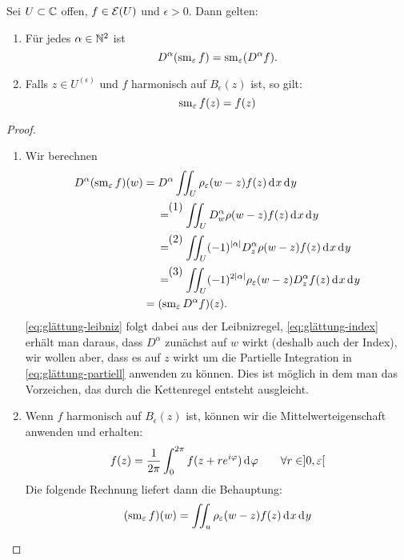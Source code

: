 \begin{lemma}
  \label{lemma:glättung-eigenschaften}
  Sei $U \subset \mathbb{C}$ offen, $f \in \mathcal{E}(U)$ und $\epsilon > 0 $. Dann
  gelten:
  \begin{enumerate}
  \item Für jedes $\alpha \in \mathbb{N}^2$ ist
    \[
    D^\alpha( \operatorname{sm}_\varepsilon f) =
    \operatorname{sm}_\varepsilon (D^\alpha f).
    \]
  \item Falls $z \in U^{(\epsilon)}$ und $f$ harmonisch auf
    $B_\epsilon(z)$ ist, so gilt:
    \[
    \operatorname{sm}_\varepsilon f(z) = f(z)
    \]
  \end{enumerate}
\end{lemma}


\begin{proof}
  \begin{enumerate}
  \item Wir berechnen
    \begin{align*}
      D^\alpha (\sm_\epsilon f)(w) & = D^\alpha \iint_U \rho_\epsilon(w
      - z) f(z) \d[x] \d[y] \\
      & \stackrel{\tag{1}}{=} \iint_U D_w^\alpha \rho(w - z) f(z)
      \d[x] \d[y] \label{eq:glättung-leibniz}\\
      & \stackrel{\tag{2}}{=} \iint_U (-1)^{|\alpha|} D_z^\alpha
      \rho(w-z) f(z) \d[x] \d[y] \label{eq:glättung-index}\\
      & \stackrel{\tag{3}}{=} \iint_U (-1)^{2|\alpha|}
      \rho_\epsilon(w-z) D^\alpha_z f(z)
      \d[x]\d[y] \label{eq:glättung-partiell}\\
      & = (\sm_\epsilon D^\alpha f)(z).
    \end{align*}
    \eqref{eq:glättung-leibniz} folgt dabei aus der Leibnizregel,
    \eqref{eq:glättung-index} erhält man daraus, dass $D^\alpha$
    zunächst auf $w$ wirkt (deshalb auch der Index), wir wollen aber,
    dass es auf $z$ wirkt um die Partielle Integration in
    \eqref{eq:glättung-partiell} anwenden zu können. Dies ist möglich
    in dem man das Vorzeichen, das durch die Kettenregel entsteht
    ausgleicht.
  \item Wenn $f$ harmonisch auf $B_\epsilon(z)$ ist, können wir die
    Mittelwerteigenschaft anwenden und erhalten:
    \[
    f(z) = \frac{1}{2\pi} \int_0^{2\pi}f(z + re^{i\phi}) \d[\phi]
    \qquad \forall r \in ]0, \epsilon[
    \]
    Die folgende Rechnung liefert dann die Behauptung:
    \begin{align}
      (\sm_\epsilon f)(w) & = \iint_u \rho_\epsilon(w- z) f(z)
      \d[x]\d[y] \nonumber\\

\end{align}
\end{enumerate}
\end{proof}
